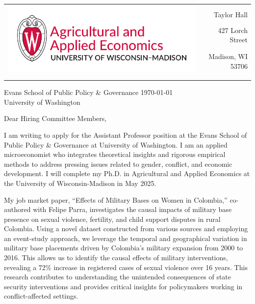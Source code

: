 \documentclass[12pt]{letter}
\begin{document}
\begin{tabularx}{\textwidth}{Xr}
\multirow{4}{*}{\includegraphics[height=3\baselineskip]{logo_cropped.pdf}} &  \\
& Taylor Hall \\
& 427 Lorch Street \\
& Madison, WI 53706 \\
[-1.8ex]\\
\\
\end{tabularx}

Evans School of Public Policy \& Governance  \hfill \today \\
University of Washington

\medskip

Dear Hiring Committee Members,

I am writing to apply for the Assistant Professor position at the Evans School of Public Policy \& Governance at University of Washington. 
I am an applied microeconomist who integrates theoretical insights and rigorous empirical methods to address pressing issues related to gender, conflict, and economic development.
I will complete my Ph.D. in Agricultural and Applied Economics at the University of Wisconsin-Madison in May 2025. 

My job market paper, “Effects of Military Bases on Women in Colombia,” co-authored with Felipe Parra, investigates the causal impacts of military base presence 
on sexual violence, fertility, and child support disputes in rural Colombia. Using a novel dataset constructed from various sources and employing an event-study approach, 
we leverage the temporal and geographical variation in military base placements driven by Colombia's military expansion from 2000 to 2016. This allows us to identify 
the causal effects of military interventions, revealing a 72\% increase in registered cases of sexual violence over 16 years. 
This research contributes to understanding the unintended consequences of state security interventions and provides critical insights 
for policymakers working in conflict-affected settings.
\end{document}
